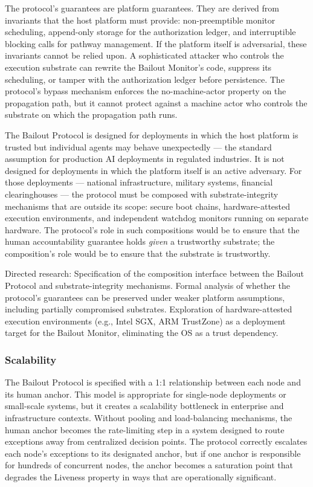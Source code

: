 The protocol's guarantees are platform guarantees. They are derived from invariants that the host platform must provide: non-preemptible monitor scheduling, append-only storage for the authorization ledger, and interruptible blocking calls for pathway management. If the platform itself is adversarial, these invariants cannot be relied upon. A sophisticated attacker who controls the execution substrate can rewrite the Bailout Monitor's code, suppress its scheduling, or tamper with the authorization ledger before persistence. The protocol's bypass mechanism enforces the no-machine-actor property on the propagation path, but it cannot protect against a machine actor who controls the substrate on which the propagation path runs.

The Bailout Protocol is designed for deployments in which the host platform is trusted but individual agents may behave unexpectedly --- the standard assumption for production AI deployments in regulated industries. It is not designed for deployments in which the platform itself is an active adversary. For those deployments --- national infrastructure, military systems, financial clearinghouses --- the protocol must be composed with substrate-integrity mechanisms that are outside its scope: secure boot chains, hardware-attested execution environments, and independent watchdog monitors running on separate hardware. The protocol's role in such compositions would be to ensure that the human accountability guarantee holds \emph{given} a trustworthy substrate; the composition's role would be to ensure that the substrate is trustworthy.

Directed research: Specification of the composition interface between the Bailout Protocol and substrate-integrity mechanisms. Formal analysis of whether the protocol's guarantees can be preserved under weaker platform assumptions, including partially compromised substrates. Exploration of hardware-attested execution environments (e.g., Intel SGX, ARM TrustZone) as a deployment target for the Bailout Monitor, eliminating the OS as a trust dependency.

\subsubsection{Scalability}

The Bailout Protocol is specified with a 1:1 relationship between each node and its human anchor. This model is appropriate for single-node deployments or small-scale systems, but it creates a scalability bottleneck in enterprise and infrastructure contexts. Without pooling and load-balancing mechanisms, the human anchor becomes the rate-limiting step in a system designed to route exceptions away from centralized decision points. The protocol correctly escalates each node's exceptions to its designated anchor, but if one anchor is responsible for hundreds of concurrent nodes, the anchor becomes a saturation point that degrades the Liveness property in ways that are operationally significant.

